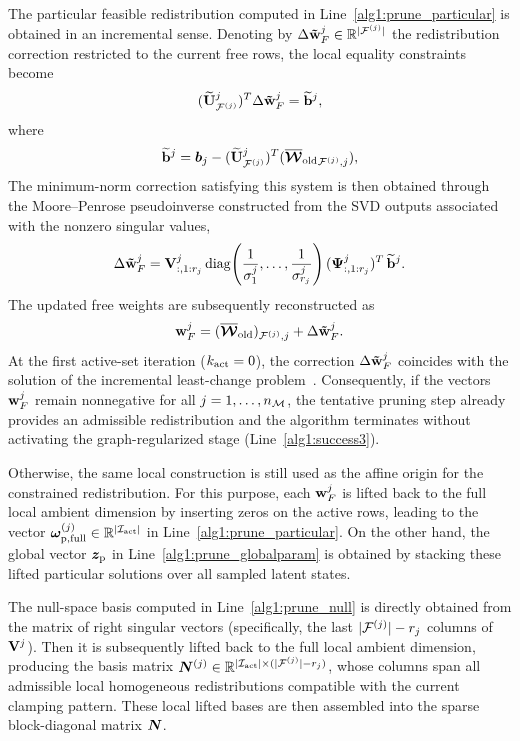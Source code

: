 \documentclass[11pt,a4paper]{article}
\begin{document}

The particular feasible redistribution computed in
Line~\ref{alg1:prune_particular} is obtained in an incremental
sense. Denoting by \(\Delta\mathbf{\tilde{w}}_{F}^{j}\in\mathbb{R}^{|\mathcal{F}^{(j)}|}\) the redistribution
correction restricted to the current free rows, the local equality
constraints become
\[
({\widetilde{\mathbf{U}}^{j}}_{\mathcal{F}^{(j)}})^T \Delta\mathbf{\tilde{w}}_{F}^{j}
=
\widetilde{\mathbf{b}}^{j},
\]
where
\[
\widetilde{\mathbf{b}}^{j}
=
\bm{b}_{j}
-
({\widetilde{\mathbf{U}}^{j}}_{\mathcal{F}^{(j)}})^T
({\overline{\boldsymbol{\mathcal{W}}}_{\mathrm{old}}}_{\mathcal{F}^{(j)},j}),
\]
The minimum-norm correction satisfying this system is then obtained
through the Moore--Penrose pseudoinverse constructed from the SVD
outputs associated with the nonzero singular values,
\[
\Delta\mathbf{\tilde{w}}_{F}^{j}
=
\mathbf{V}^{j}_{:,1:r_j}
\operatorname{diag}\!\left(
\frac{1}{\sigma_1^{j}},\ldots,
\frac{1}{\sigma_{r_j}^{j}}
\right)
(\boldsymbol{\Psi}^{j}_{:,1:r_j})^T
\,\widetilde{\mathbf{b}}^{j}.
\]
The updated free weights are subsequently reconstructed as
\begin{equation}
\label{eq:particularSOLUTION}
\mathbf{w}_{F}^{j}
=
({\overline{\boldsymbol{\mathcal{W}}}_{\mathrm{old}}})_{\mathcal{F}^{(j)},j}
+
\Delta\mathbf{\tilde{w}}_{F}^{j}.
\end{equation}
At the first active-set iteration (\(k_{\mathrm{act}}=0\)), the correction
\(\Delta\mathbf{\tilde{w}}_{F}^{j}\) coincides with the solution of the incremental
least-change problem~. Consequently, if the
vectors \(\mathbf{w}_{F}^{j}\) remain nonnegative for all
\(j=1,\ldots,n_{\mathcal{M}}\), the tentative pruning step already provides an
admissible redistribution and the algorithm terminates without
activating the graph-regularized stage
(Line~\ref{alg1:success3}).

Otherwise, the same local construction is still used as the affine
origin for the constrained redistribution. For this purpose, each
\(\mathbf{w}_{F}^{j}\) is lifted back to the full local ambient dimension by
inserting zeros on the active rows, leading to the vector
\(\bm{\omega}_{\mathrm{p,full}}^{(j)}\in\mathbb{R}^{|\mathcal{I}_{\mathrm{act}}|}\)   in Line~\ref{alg1:prune_particular}. On the other hand, the global vector \(\bm{z}_{\mathrm{p}}\) in
Line~\ref{alg1:prune_globalparam} is obtained by stacking these lifted
particular solutions over all sampled latent states.

%
The null-space basis computed in
Line~\ref{alg1:prune_null}  is directly obtained from the matrix of right singular vectors  (specifically, the last  $|\mathcal{F}^{(j)}| -r_j$ columns of  \(\mathbf{V}^{j}\)).
 Then  it is subsequently
lifted back to the full local ambient dimension, producing  the basis matrix
$\bm{N}^{(j)}\in\mathbb{R}^{|\mathcal{I}_{\mathrm{act}}|\times(|\mathcal{F}^{(j)}|-r_j)}$, whose columns span all admissible local homogeneous redistributions
compatible with the current clamping pattern. These local lifted bases  are then assembled into the sparse
block-diagonal matrix \(\bm{N}\).
\end{document}
